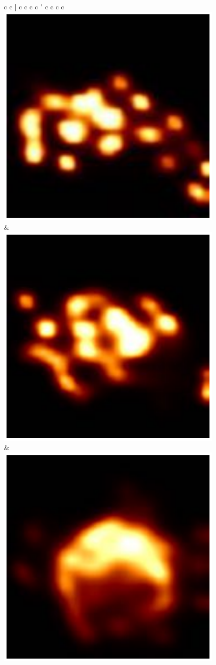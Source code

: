 \begin{figure}
\begin{center}
\begin{tabular}{  c c | c  c  c  c "  c  c  c  c  }
			\includegraphics[height=.1\linewidth]{figures/starwarps_results/hotspot100sR2/eht2017_100_compare/none_amp-clphase_blur025.pdf} &
			\includegraphics[height=.1\linewidth]{figures/starwarps_results/hotspot100sR2/ehtfuture2_100_compare/none_amp-clphase_blur025.pdf} &
			\includegraphics[height=.1\linewidth]{figures/starwarps_results/hotspot100sR2/ehtfuture1_100_compare/none_amp-clphase_blur025.pdf} 
			\\   \thickhline
			

\end{tabular}
\end{center}
\end{figure}
